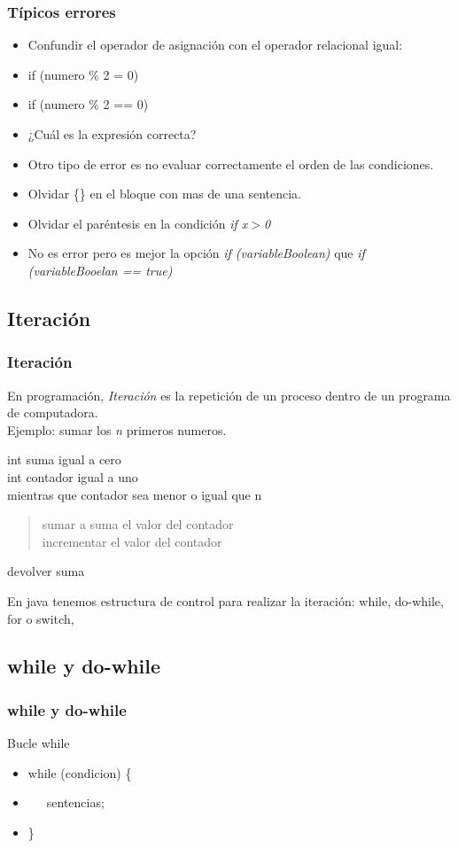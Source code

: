 \documentclass{beamer}
\begin{document}
\begin{frame}
    \frametitle{Típicos errores}
\begin{itemize}[<+->]

      \item Confundir el operador de asignación con el operador relacional igual:
      \item if (numero \% 2 = 0) 
      \item if (numero \% 2 == 0) 
      \item ¿Cuál es la expresión correcta?
      \item Otro tipo de error es no evaluar correctamente el orden de las condiciones.
      \item Olvidar \{\} en el bloque con mas de una sentencia.
      \item Olvidar el paréntesis en la condición \emph{if x$>$0}
      \item No es error pero es mejor la opción \emph{if (variableBoolean)} que \emph{if (variableBooelan == true)}
      \end{itemize}
      \pause
\end{frame}



\subsection{Iteración}
\begin{frame}
\frametitle{Iteración}
En programación, \emph{Iteración} es la repetición de un proceso dentro de un programa de computadora.\\
Ejemplo: sumar los \emph{n} primeros numeros.
\pause
\begin{block}{}
int suma igual a cero\\
int contador igual a uno\\
mientras que contador sea menor o igual que n\\
\begin{quote}
sumar a suma el valor del contador\\
incrementar el valor del contador\\
\end{quote}
devolver suma
\end{block}
\pause
En java tenemos estructura de control para realizar la iteración: while, do-while, for o switch, 
\end{frame}

\subsection{while y do-while}
\begin{frame}
\frametitle{while y do-while}
\begin{block}{Bucle while}
\begin{itemize}[<+-| alert@+>]
\item while (condicion) \{
\item \ \ \ sentencias;
\item \}
\end{itemize}
\end{block}
\end{frame}
\end{document}
